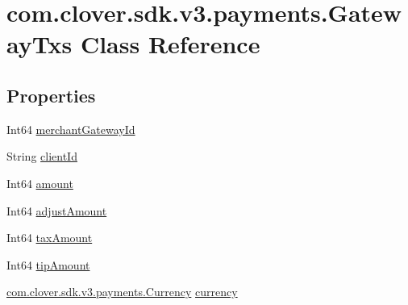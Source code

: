\hypertarget{classcom_1_1clover_1_1sdk_1_1v3_1_1payments_1_1_gateway_txs}{}\section{com.\+clover.\+sdk.\+v3.\+payments.\+Gateway\+Txs Class Reference}
\label{classcom_1_1clover_1_1sdk_1_1v3_1_1payments_1_1_gateway_txs}
\subsection*{Properties}
\begin{DoxyCompactItemize}
\item 
Int64 \hyperlink{classcom_1_1clover_1_1sdk_1_1v3_1_1payments_1_1_gateway_txs_a577b3578ce6a3d092c2fe5984ebff020}{merchant\+Gateway\+Id}
\item 
String \hyperlink{classcom_1_1clover_1_1sdk_1_1v3_1_1payments_1_1_gateway_txs_a82fcb2991e0e8d3069e65e8032a2fd07}{client\+Id}
\item 
Int64 \hyperlink{classcom_1_1clover_1_1sdk_1_1v3_1_1payments_1_1_gateway_txs_a0813723a88580b760b16aa517b2cb210}{amount}
\item 
Int64 \hyperlink{classcom_1_1clover_1_1sdk_1_1v3_1_1payments_1_1_gateway_txs_af67a09cebf61529eef102fa254a28974}{adjust\+Amount}
\item 
Int64 \hyperlink{classcom_1_1clover_1_1sdk_1_1v3_1_1payments_1_1_gateway_txs_ad81ed8f33528dd21d0f43edbde74dcc4}{tax\+Amount}
\item 
Int64 \hyperlink{classcom_1_1clover_1_1sdk_1_1v3_1_1payments_1_1_gateway_txs_ace5ce014b22199d2d50ba327bd55e6a9}{tip\+Amount}
\item 
\hyperlink{namespacecom_1_1clover_1_1sdk_1_1v3_1_1payments_a316f34e84dd323cfc42d1345dbc0944b}{com.\+clover.\+sdk.\+v3.\+payments.\+Currency} \hyperlink{classcom_1_1clover_1_1sdk_1_1v3_1_1payments_1_1_gateway_txs_a12948e5e07558ba9f9fecb3f81fc7e9d}{currency}

\end{DoxyCompactItemize}
